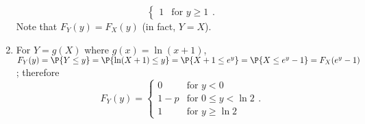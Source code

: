 \begin{exercise}
\begin{solution}
\begin{enumerate}
\begin{equation*}
\begin{cases}
					1 & \text{for } y \geq 1
				\end{cases}.
			\end{equation*}
			Note that $F_Y(y) = F_X(y)$ (in fact, $Y = X$).
			\item For $Y = g(X)$ where $g(x) = \ln(x + 1)$, $F_Y(y) = \P{Y \leq y} = \P{\ln(X + 1) \leq y} = \P{X + 1 \leq e^y} = \P{X \leq e^y - 1} = F_X(e^y - 1)$; therefore
			\begin{equation*}
				F_Y(y) =
				\begin{cases}
					0 & \text{for } y < 0 \\
					1 - p & \text{for } 0 \leq y < \ln 2 \\
					1 & \text{for } y \geq \ln 2
				\end{cases}.
			\end{equation*}
	\end{enumerate}
	\end{solution}
\end{exercise}

